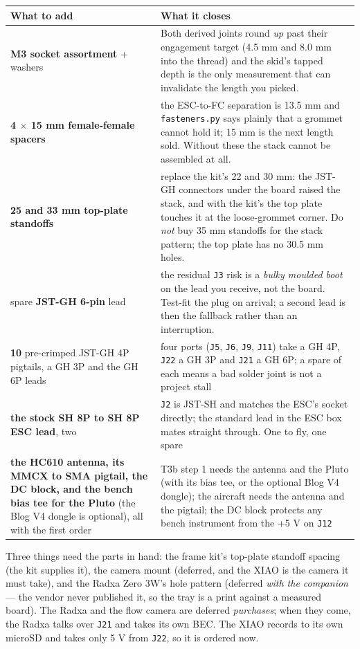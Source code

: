 \documentclass[11pt,a4paper]{article}
\newcommand{\file}[1]{\texttt{\small #1}}
\begin{document}
\begin{center}
\begin{tabular}{@{}P{0.32\textwidth}P{0.56\textwidth}@{}}
\toprule
\textbf{What to add} & \textbf{What it closes} \\
\midrule
\textbf{M3 socket assortment} + washers &
Both derived joints round \emph{up} past their engagement target (4.5 mm and 8.0 mm into
the thread) and the skid's tapped depth is the only measurement that can invalidate the
length you picked. \\
\textbf{4 $\times$ 15 mm female-female spacers} &
the ESC-to-FC separation is 13.5 mm and \file{fasteners.py} says plainly that a grommet
cannot hold it; 15 mm is the next length sold. Without these the stack cannot be assembled
at all. \\
\textbf{25 and 33 mm top-plate standoffs} &
replace the kit's 22 and 30 mm: the JST-GH connectors under the board raised the stack, and
with the kit's the top plate touches it at the loose-grommet corner. Do \emph{not} buy 35 mm
standoffs for the stack pattern; the top plate has no 30.5 mm holes. \\
spare \textbf{JST-GH 6-pin} lead &
the residual \file{J3} risk is a \emph{bulky moulded boot} on the lead you receive, not the
board. Test-fit the plug on arrival; a second lead is then the fallback rather than an
interruption. \\
\textbf{10} pre-crimped JST-GH 4P pigtails, a GH 3P and the GH 6P leads &
four ports (\file{J5}, \file{J6}, \file{J9}, \file{J11}) take a GH 4P, \file{J22} a GH 3P and
\file{J21} a GH 6P; a spare of each means a bad solder joint is not a project stall \\
\textbf{the stock SH 8P to SH 8P ESC lead}, two &
\file{J2} is JST-SH and matches the ESC's socket directly; the standard lead in the ESC box
mates straight through. One to fly, one spare \\
\textbf{the HC610 antenna, its MMCX to SMA pigtail, the DC block, and the bench bias tee for the Pluto}
(the Blog V4 dongle is optional), all with the first order &
T3b step 1 needs the antenna and the Pluto (with its bias tee, or the optional Blog V4 dongle); the aircraft needs the antenna and the
pigtail; the DC block protects any bench instrument from the +5 V on \file{J12} \\
\bottomrule
\end{tabular}
\end{center}

Three things need the parts in hand: the frame kit's top-plate standoff spacing (the kit
supplies it), the camera mount (deferred, and the XIAO is the camera it must take), and the
Radxa Zero 3W's hole pattern (deferred \emph{with the companion} --- the vendor never
published it, so the tray is a print against a measured board). The Radxa and the flow
camera are deferred \emph{purchases}; when they come, the Radxa talks over \file{J21} and
takes its own BEC. The XIAO records to its own microSD and takes only 5 V from \file{J22},
so it is ordered now.
\end{document}
